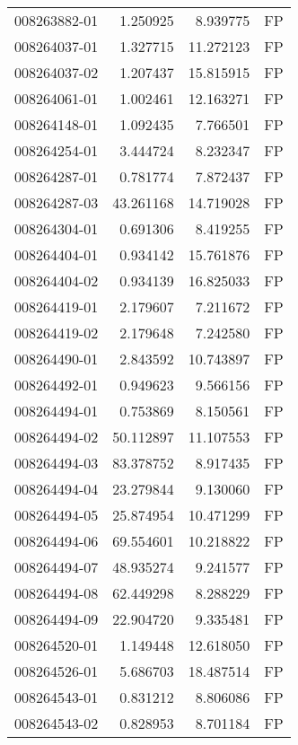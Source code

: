 \begin{tabular}{lrrl}
008263882-01 &    1.250925 &       8.939775 &   FP \\
008264037-01 &    1.327715 &      11.272123 &   FP \\
008264037-02 &    1.207437 &      15.815915 &   FP \\
008264061-01 &    1.002461 &      12.163271 &   FP \\
008264148-01 &    1.092435 &       7.766501 &   FP \\
008264254-01 &    3.444724 &       8.232347 &   FP \\
008264287-01 &    0.781774 &       7.872437 &   FP \\
008264287-03 &   43.261168 &      14.719028 &   FP \\
008264304-01 &    0.691306 &       8.419255 &   FP \\
008264404-01 &    0.934142 &      15.761876 &   FP \\
008264404-02 &    0.934139 &      16.825033 &   FP \\
008264419-01 &    2.179607 &       7.211672 &   FP \\
008264419-02 &    2.179648 &       7.242580 &   FP \\
008264490-01 &    2.843592 &      10.743897 &   FP \\
008264492-01 &    0.949623 &       9.566156 &   FP \\
008264494-01 &    0.753869 &       8.150561 &   FP \\
008264494-02 &   50.112897 &      11.107553 &   FP \\
008264494-03 &   83.378752 &       8.917435 &   FP \\
008264494-04 &   23.279844 &       9.130060 &   FP \\
008264494-05 &   25.874954 &      10.471299 &   FP \\
008264494-06 &   69.554601 &      10.218822 &   FP \\
008264494-07 &   48.935274 &       9.241577 &   FP \\
008264494-08 &   62.449298 &       8.288229 &   FP \\
008264494-09 &   22.904720 &       9.335481 &   FP \\
008264520-01 &    1.149448 &      12.618050 &   FP \\
008264526-01 &    5.686703 &      18.487514 &   FP \\
008264543-01 &    0.831212 &       8.806086 &   FP \\
008264543-02 &    0.828953 &       8.701184 &   FP \\

\end{tabular}
